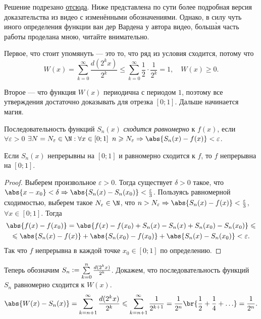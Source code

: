 \begin{solution}
    Решение подрезано \href{https://www.youtube.com/watch?v=j98EXfi438E}{отсюда}. Ниже представлена по сути более подробная версия доказательства из видео с изменёнными обозначениями. Однако, в силу чуть иного определения функции ван дер Вардена у автора видео, больш\`{а}я часть работы проделана мною, читайте внимательно.

    Первое, что стоит упомянуть --- это то, что ряд из условия сходится, потому что
    \[
        W(x) = \sum_{k = 0}^\infty\frac{d(2^kx)}{2^k} \leqslant \sum_{k = 0}^\infty\frac{1}{2} \cdot \frac{1}{2^k} = 1,\quad W(x) \geqslant 0.
    \]

    Второе --- что функция $W(x)$ периодична с периодом $1$, поэтому все утверждения достаточно доказывать для отрезка $[0; 1]$. Дальше начинается магия.

    \begin{definition}
        Последовательность функций $S_n(x)$ \textit{сходится равномерно} к $f(x)$, если $\forall\varepsilon > 0$ $\exists N = N_\varepsilon \in \N: \forall x \in [0; 1]$ $n \geqslant N_\varepsilon \Rightarrow \abs{S_n(x) - f(x)} < \varepsilon$.
    \end{definition}

    \begin{theorem}
        Если $S_n(x)$ непрерывны на $[0; 1]$ и равномерно сходится к $f$, то $f$ непрерывна на $[0; 1]$.
    \end{theorem}

    \begin{proof}
        Выберем произвольное $\varepsilon > 0$. Тогда существует $\delta > 0$ такое, что $\abs{x - x_0} < \delta \Rightarrow \abs{S_n(x) - S_n(x_0)} < \frac{\varepsilon}{3}$. Пользуясь равномерной сходимостью, выберем такое $N_\varepsilon \in \N$, что $n > N_\varepsilon \Rightarrow \abs{S_n(x) - f(x)} < \frac{\varepsilon}{3}$, $\forall x \in [0; 1]$. Тогда
        \begin{multline*}
            \abs{f(x) - f(x_0)} = \abs{f(x) - f(x_0) + S_n(x) - S_n(x) + S_n(x_0) - S_n(x_0)} \leqslant\\ \leqslant \abs{S_n(x) - f(x)} + \abs{S_n(x_0) - f(x_0)} + \abs{S_n(x) - S_n(x_0)} < \varepsilon.
        \end{multline*}
        Так что $f$ непрерывна в каждой точке $x_0 \in [0; 1]$ по определению.
    \end{proof}

    Теперь обозначим $S_n \vcentcolon = \sum\limits_{k = 0}^n\frac{d(2^kx)}{2^k}$. Докажем, что последовательность функций $S_n$ равномерно сходится к $W(x)$.
    \[
        \abs{W(x) - S_n(x)} = \sum_{k = n + 1}^\infty\frac{d(2^kx)}{2^k} \leqslant \sum_{k = n + 1}^\infty\frac{1}{2^{k + 1}} = \frac{1}{2^n}\br{\frac{1}{2} + \frac{1}{4} + \ldots} = \frac{1}{2^n}.
    \]


\end{solution}
